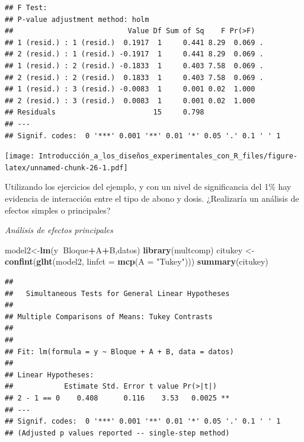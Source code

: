 \documentclass[]{book}
\newenvironment{Shaded}{\begin{snugshade}}{\end{snugshade}}
\newcommand{\KeywordTok}[1]{\textcolor[rgb]{0.13,0.29,0.53}{\textbf{#1}}}
\newcommand{\DataTypeTok}[1]{\textcolor[rgb]{0.13,0.29,0.53}{#1}}
\newcommand{\DecValTok}[1]{\textcolor[rgb]{0.00,0.00,0.81}{#1}}
\newcommand{\StringTok}[1]{\textcolor[rgb]{0.31,0.60,0.02}{#1}}
\newcommand{\OperatorTok}[1]{\textcolor[rgb]{0.81,0.36,0.00}{\textbf{#1}}}
\newcommand{\NormalTok}[1]{#1}
\begin{document}
\begin{verbatim}
## F Test: 
## P-value adjustment method: holm
##                           Value Df Sum of Sq    F Pr(>F)  
## 1 (resid.) : 1 (resid.)  0.1917  1     0.441 8.29  0.069 .
## 2 (resid.) : 1 (resid.) -0.1917  1     0.441 8.29  0.069 .
## 1 (resid.) : 2 (resid.) -0.1833  1     0.403 7.58  0.069 .
## 2 (resid.) : 2 (resid.)  0.1833  1     0.403 7.58  0.069 .
## 1 (resid.) : 3 (resid.) -0.0083  1     0.001 0.02  1.000  
## 2 (resid.) : 3 (resid.)  0.0083  1     0.001 0.02  1.000  
## Residuals                       15     0.798              
## ---
## Signif. codes:  0 '***' 0.001 '**' 0.01 '*' 0.05 '.' 0.1 ' ' 1
\end{verbatim}

\begin{Shaded}
\end{Shaded}

\texttt{[image: Introducción\_a\_los\_diseños\_experimentales\_con\_R\_files/figure-latex/unnamed-chunk-26-1.pdf]}

Utilizando los ejercicios del ejemplo, y con un nivel de significancia
del 1\% hay evidencia de interacción entre el tipo de abono y dosis.
¿Realizaría un análisis de efectos simples o principales?

\emph{Análisis de efectos principales}

\begin{Shaded}
\begin{Highlighting}[]
\NormalTok{model2<-}\KeywordTok{lm}\NormalTok{(y}\OperatorTok{~}\NormalTok{Bloque}\OperatorTok{+}\NormalTok{A}\OperatorTok{+}\NormalTok{B,datos)}
\KeywordTok{library}\NormalTok{(multcomp)}
\NormalTok{citukey <-}\StringTok{ }\KeywordTok{confint}\NormalTok{(}\KeywordTok{glht}\NormalTok{(model2, }\DataTypeTok{linfct =} \KeywordTok{mcp}\NormalTok{(}\DataTypeTok{A =} \StringTok{"Tukey"}\NormalTok{)))}
\KeywordTok{summary}\NormalTok{(citukey)}
\end{Highlighting}
\end{Shaded}

\begin{verbatim}
## 
##   Simultaneous Tests for General Linear Hypotheses
## 
## Multiple Comparisons of Means: Tukey Contrasts
## 
## 
## Fit: lm(formula = y ~ Bloque + A + B, data = datos)
## 
## Linear Hypotheses:
##            Estimate Std. Error t value Pr(>|t|)   
## 2 - 1 == 0    0.408      0.116    3.53   0.0025 **
## ---
## Signif. codes:  0 '***' 0.001 '**' 0.01 '*' 0.05 '.' 0.1 ' ' 1
## (Adjusted p values reported -- single-step method)
\end{verbatim}
\end{document}
